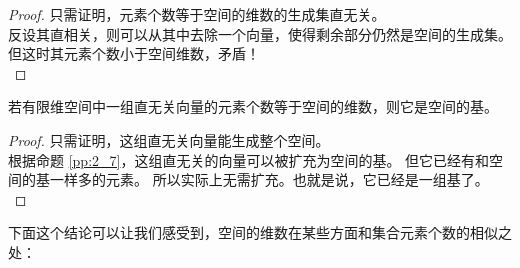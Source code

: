 \documentclass[12pt,UTF8]{ctexbook}
\begin{document}
\begin{proof} %
    只需证明，元素个数等于空间的维数的生成集直无关。\\
    反设其直相关，则可以从其中去除一个向量，使得剩余部分仍然是空间的生成集。
    但这时其元素个数小于空间维数，矛盾！\\
\end{proof}


\begin{pp}\label{pp:2_12}
    若有限维空间中一组直无关向量的元素个数等于空间的维数，则它是空间的基。
\end{pp}

\begin{proof} %
    只需证明，这组直无关向量能生成整个空间。\\
    根据命题 \ref{pp:2_7}，这组直无关的向量可以被扩充为空间的基。
    但它已经有和空间的基一样多的元素。
    所以实际上无需扩充。也就是说，它已经是一组基了。\\    
\end{proof}


下面这个结论可以让我们感受到，空间的维数在某些方面和集合元素个数的相似之处：
\end{document}
